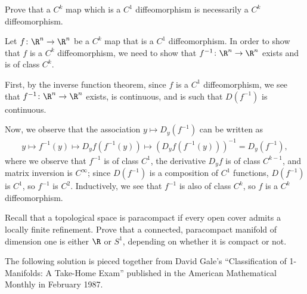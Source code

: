 \documentclass[10pt]{mypackage}
\begin{document}
\begin{problem}[Problem 3]
  Prove that a $C^{k}$ map which is a $C^{1}$ diffeomorphism is necessarily a $C^{k}$ diffeomorphism.
\end{problem}
\begin{solution}
  Let $f\colon \R^{n}\rightarrow \R^{n}$ be a $C^{k}$ map that is a $C^{1}$ diffeomorphism. In order to show that $f$ is a $C^{k}$ diffeomorphism, we need to show that $f^{-1}\colon \R^{n}\rightarrow \R^{n}$ exists and is of class $C^{k}$.\newline

  First, by the inverse function theorem, since $f$ is a $C^{1}$ diffeomorphism, we see that $f^{-1}\colon \R^{n}\rightarrow \R^{n}$ exists, is continuous, and is such that $D\left( f^{-1} \right)$ is continuous.\newline

  Now, we observe that the association $y\mapsto D_y\left( f^{-1} \right)$ can be written as
  \begin{align*}
    y \mapsto f^{-1}(y) \mapsto D_{y}f\left( f^{-1}(y) \right) \mapsto \left( D_yf\left( f^{-1}\left( y \right) \right) \right)^{-1} = D_y\left( f^{-1} \right),
  \end{align*}
  where we observe that $f^{-1}$ is of class $C^1$, the derivative $D_y f$ is of class $C^{k-1}$, and matrix inversion is $C^{\infty}$; since $D\left( f^{-1} \right)$ is a composition of $C^{1}$ functions, $D\left( f^{-1} \right)$ is $C^{1}$, so $f^{-1}$ is $C^{2}$. Inductively, we see that $f^{-1}$ is also of class $C^{k}$, so $f$ is a $C^{k}$ diffeomorphism.
\end{solution}
\begin{problem}[Problem 4]
  Recall that a topological space is paracompact if every open cover admits a locally finite refinement. Prove that a connected, paracompact manifold of dimension one is either $\R$ or $S^{1}$, depending on whether it is compact or not.
\end{problem}
\begin{remark}
  The following solution is pieced together from David Gale's ``Classification of 1-Manifolds: A Take-Home Exam'' published in the American Mathematical Monthly in February 1987.
\end{remark}
\end{document}
